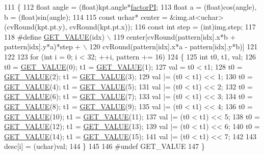 \begin{DoxyCode}
111 \{
112     \textcolor{keywordtype}{float} angle = (float)kpt.angle*\hyperlink{namespaceORB__SLAM2_a8015b470ffeb885a0c90837a03b3210f}{factorPI};
113     \textcolor{keywordtype}{float} a = (\textcolor{keywordtype}{float})cos(angle), b = (float)sin(angle);
114 
115     \textcolor{keyword}{const} uchar* center = &img.at<uchar>(cvRound(kpt.pt.y), cvRound(kpt.pt.x));
116     \textcolor{keyword}{const} \textcolor{keywordtype}{int} step = (int)img.step;
117 
118     #define \hyperlink{ORBextractor_8cc_a35931865021519a9d7a2a4d2f196e684}{GET\_VALUE}(idx) \(\backslash\)
119         center[cvRound(pattern[idx].x*b + pattern[idx].y*a)*step + \(\backslash\)
120                cvRound(pattern[idx].x*a - pattern[idx].y*b)]
121 
122 
123     \textcolor{keywordflow}{for} (\textcolor{keywordtype}{int} i = 0; i < 32; ++i, pattern += 16)
124     \{
125         \textcolor{keywordtype}{int} t0, t1, val;
126         t0 = \hyperlink{ORBextractor_8cc_a35931865021519a9d7a2a4d2f196e684}{GET\_VALUE}(0); t1 = \hyperlink{ORBextractor_8cc_a35931865021519a9d7a2a4d2f196e684}{GET\_VALUE}(1);
127         val = t0 < t1;
128         t0 = \hyperlink{ORBextractor_8cc_a35931865021519a9d7a2a4d2f196e684}{GET\_VALUE}(2); t1 = \hyperlink{ORBextractor_8cc_a35931865021519a9d7a2a4d2f196e684}{GET\_VALUE}(3);
129         val |= (t0 < t1) << 1;
130         t0 = \hyperlink{ORBextractor_8cc_a35931865021519a9d7a2a4d2f196e684}{GET\_VALUE}(4); t1 = \hyperlink{ORBextractor_8cc_a35931865021519a9d7a2a4d2f196e684}{GET\_VALUE}(5);
131         val |= (t0 < t1) << 2;
132         t0 = \hyperlink{ORBextractor_8cc_a35931865021519a9d7a2a4d2f196e684}{GET\_VALUE}(6); t1 = \hyperlink{ORBextractor_8cc_a35931865021519a9d7a2a4d2f196e684}{GET\_VALUE}(7);
133         val |= (t0 < t1) << 3;
134         t0 = \hyperlink{ORBextractor_8cc_a35931865021519a9d7a2a4d2f196e684}{GET\_VALUE}(8); t1 = \hyperlink{ORBextractor_8cc_a35931865021519a9d7a2a4d2f196e684}{GET\_VALUE}(9);
135         val |= (t0 < t1) << 4;
136         t0 = \hyperlink{ORBextractor_8cc_a35931865021519a9d7a2a4d2f196e684}{GET\_VALUE}(10); t1 = \hyperlink{ORBextractor_8cc_a35931865021519a9d7a2a4d2f196e684}{GET\_VALUE}(11);
137         val |= (t0 < t1) << 5;
138         t0 = \hyperlink{ORBextractor_8cc_a35931865021519a9d7a2a4d2f196e684}{GET\_VALUE}(12); t1 = \hyperlink{ORBextractor_8cc_a35931865021519a9d7a2a4d2f196e684}{GET\_VALUE}(13);
139         val |= (t0 < t1) << 6;
140         t0 = \hyperlink{ORBextractor_8cc_a35931865021519a9d7a2a4d2f196e684}{GET\_VALUE}(14); t1 = \hyperlink{ORBextractor_8cc_a35931865021519a9d7a2a4d2f196e684}{GET\_VALUE}(15);
141         val |= (t0 < t1) << 7;
142 
143         desc[i] = (uchar)val;
144     \}
145 
146 \textcolor{preprocessor}{    #undef GET\_VALUE}
147 \}
\end{DoxyCode}


